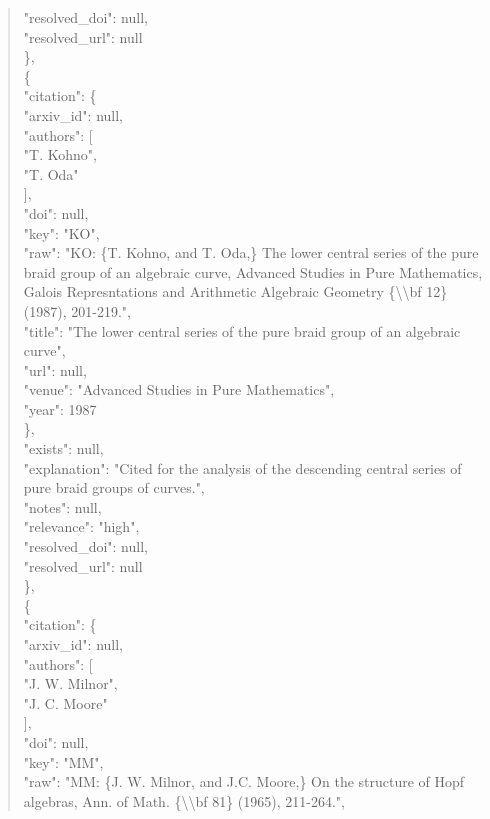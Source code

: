 \documentclass[11pt]{article}
\begin{document}
\begin{quote}
      "resolved\_doi": null,\\
      "resolved\_url": null\\
    \},\\
    \{\\
      "citation": \{\\
        "arxiv\_id": null,\\
        "authors": [\\
          "T. Kohno",\\
          "T. Oda"\\
        ],\\
        "doi": null,\\
        "key": "KO",\\
        "raw": "KO: \{T. Kohno, and T. Oda,\} The lower central series of the pure braid group of an algebraic curve, Advanced Studies in Pure Mathematics, Galois Represntations and Arithmetic Algebraic Geometry \{\textbackslash{}\textbackslash{}bf 12\} (1987), 201-219.",\\
        "title": "The lower central series of the pure braid group of an algebraic curve",\\
        "url": null,\\
        "venue": "Advanced Studies in Pure Mathematics",\\
        "year": 1987\\
      \},\\
      "exists": null,\\
      "explanation": "Cited for the analysis of the descending central series of pure braid groups of curves.",\\
      "notes": null,\\
      "relevance": "high",\\
      "resolved\_doi": null,\\
      "resolved\_url": null\\
    \},\\
    \{\\
      "citation": \{\\
        "arxiv\_id": null,\\
        "authors": [\\
          "J. W. Milnor",\\
          "J. C. Moore"\\
        ],\\
        "doi": null,\\
        "key": "MM",\\
        "raw": "MM: \{J. W. Milnor, and J.C. Moore,\} On the structure of Hopf algebras, Ann. of Math. \{\textbackslash{}\textbackslash{}bf 81\} (1965), 211-264.",\\

\end{quote}
\end{document}

